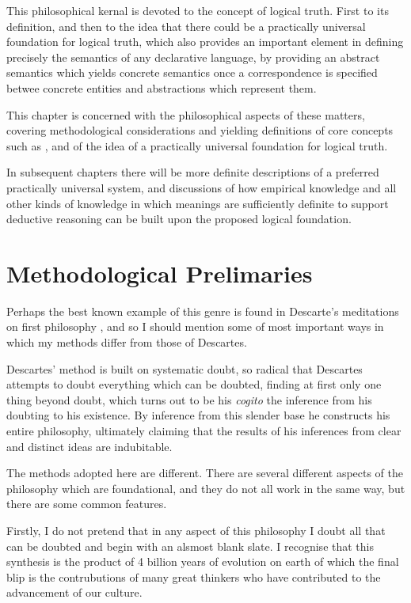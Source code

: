 
This philosophical kernal is devoted to the concept of logical truth.
First to its definition, and then to the idea that there could be a practically universal foundation for logical truth, which also provides an important element in defining precisely the semantics of any declarative language, by providing an abstract semantics which yields concrete semantics once a correspondence is specified betwee concrete entities and abstractions which represent them.

This chapter is concerned with the philosophical aspects of these matters, covering methodological considerations and yielding definitions of core concepts such as , and of the idea of a practically universal foundation for logical truth.

In subsequent chapters there will be more definite descriptions of a preferred practically universal system, and discussions of how empirical knowledge and all other kinds of knowledge in which meanings are sufficiently definite to support deductive reasoning can be built upon the proposed logical foundation.

\section{Methodological Prelimaries}

Perhaps the best known example of this genre is found in Descarte's meditations on first philosophy \cite{descartes2013meditations}, and so I should mention some of most important ways in which my methods differ from those of Descartes.

Descartes' method is built on systematic doubt, so radical that Descartes attempts to doubt everything which can be doubted, finding at first only one thing beyond doubt, which turns out to be his \emph{cogito} the inference from his doubting to his existence.
By inference from this slender base he constructs his entire philosophy, ultimately claiming that the results of his inferences from clear and distinct ideas are indubitable.

The methods adopted here are different.
There are several different aspects of the philosophy which are foundational, and they do not all work in the same way, but there are some common features.

Firstly, I do not pretend that in any aspect of this philosophy I doubt all that can be doubted and begin with an alsmost blank slate.
I recognise that this synthesis is the product of 4 billion years of evolution on earth of which the final blip is the contrubutions of many great thinkers who have contributed to the advancement of our culture.

